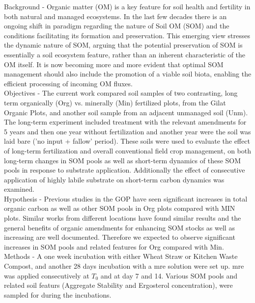 	Background - Organic matter (OM) is a key feature for soil health and fertility in both natural and managed ecosystems. In the last few decades there is an ongoing shift in paradigm regarding the nature of Soil OM (SOM) and the conditions facilitating its formation and preservation. This emerging view stresses the dynamic nature of SOM, arguing that the potential preservation of SOM is essentially a soil ecosystem feature, rather than an inherent characteristic of the OM itself. It is now becoming more and more evident that optimal SOM management should also include the promotion of a viable soil biota, enabling the efficient processing of incoming OM fluxes. \\
	Objectives - The current work compared soil samples of two contrasting, long term organically (Org) vs. minerally (Min) fertilized plots, from the Gilat Organic Plots, and another soil sample from an adjacent unmanaged soil (Unm). The long-term experiment included treatment with the relevant amendments for 5 years and then one year without fertilization and another year were the soil was laid bare ('no input + fallow' period). These soils were used to evaluate the effect of long-term fertilization and overall conventional field crop management, on both long-term changes in SOM pools as well as short-term dynamics of these SOM pools in response to substrate application. Additionally the effect of consecutive application of highly labile substrate on short-term carbon dynamics was examined. \\
	Hypothesis - Previous studies in the GOP have seen significant increases in total organic carbon as well as other SOM pools in Org plots compared with MIN plots. Similar works from different locations have found similar results and the general benefits of organic amendments for enhancing SOM stocks as well as increasing  are well documented. Therefore we expected to observe significant increases in SOM pools and related features for Org compared with Min. 
	Methods - A one week incubation with either Wheat Straw or Kitchen Waste Compost, and another 28 days incubation with a \gls{mre} solution were set up. \gls{mre} was applied consecutively at $ T_0 $ and at day 7 and 14. Various SOM pools and related soil featurs (Aggregate Stability and Ergosterol concentration), were sampled for during the incubations.  
